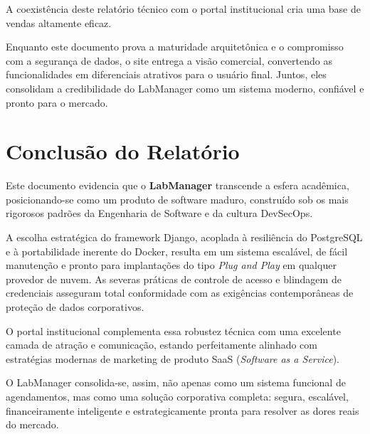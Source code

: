 \documentclass[12pt,a4paper]{article}
\begin{document}
	A coexistência deste relatório técnico com o portal institucional cria uma base de vendas altamente eficaz. 
	
	Enquanto este documento prova a maturidade arquitetônica e o compromisso com a segurança de dados, o site entrega a visão comercial, convertendo as funcionalidades em diferenciais atrativos para o usuário final. Juntos, eles consolidam a credibilidade do LabManager como um sistema moderno, confiável e pronto para o mercado.
	
	
	\section{Conclusão do Relatório}
	
	Este documento evidencia que o \textbf{LabManager} transcende a esfera acadêmica, posicionando-se como um produto de software maduro, construído sob os mais rigorosos padrões da Engenharia de Software e da cultura DevSecOps.
	
	A escolha estratégica do framework Django, acoplada à resiliência do PostgreSQL e à portabilidade inerente do Docker, resulta em um sistema escalável, de fácil manutenção e pronto para implantações do tipo \textit{Plug and Play} em qualquer provedor de nuvem. As severas práticas de controle de acesso e blindagem de credenciais asseguram total conformidade com as exigências contemporâneas de proteção de dados corporativos.
	
	O portal institucional complementa essa robustez técnica com uma excelente camada de atração e comunicação, estando perfeitamente alinhado com estratégias modernas de marketing de produto SaaS (\textit{Software as a Service}).
	
	O LabManager consolida-se, assim, não apenas como um sistema funcional de agendamentos, mas como uma solução corporativa completa: segura, escalável, financeiramente inteligente e estrategicamente pronta para resolver as dores reais do mercado.
	
	
\end{document}
